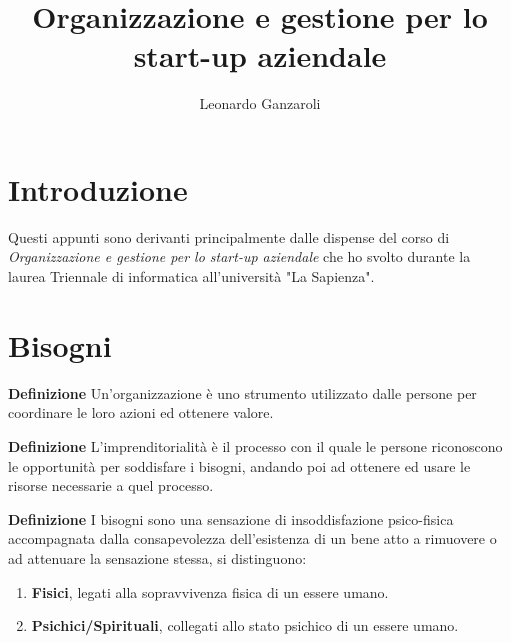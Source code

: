 \documentclass{article}
\title{Organizzazione e gestione per lo start-up aziendale}
\author{Leonardo Ganzaroli}
\date{}
\newcommand{\df}{\noindent\textbf{Definizione }}
\begin{document}
\maketitle


\tableofcontents

\newpage

\hypersetup{allcolors=black}

\section*{Introduzione}

Questi appunti sono derivanti principalmente dalle dispense del corso di \textit{Organizzazione e gestione per lo start-up aziendale} che ho svolto durante la laurea Triennale di informatica all'università "La Sapienza".

\newpage

\section{Bisogni}

\df Un'organizzazione è uno strumento utilizzato dalle persone per coordinare le loro azioni ed ottenere valore.\newline

\df L'imprenditorialità è il processo con il quale le persone riconoscono le opportunità per soddisfare i bisogni, andando poi ad ottenere ed usare le risorse necessarie a quel processo.\newline

\df I bisogni sono una sensazione di insoddisfazione psico-fisica accompagnata dalla consapevolezza dell’esistenza di un bene atto a rimuovere o ad attenuare la sensazione stessa, si distinguono:
\begin{enumerate}
    \item \textbf{Fisici}, legati alla sopravvivenza fisica di un essere umano.
    \item \textbf{Psichici/Spirituali}, collegati allo stato psichico di un essere umano.
\end{enumerate}
\end{document}
